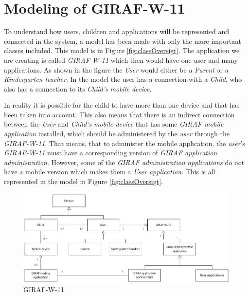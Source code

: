 \section{Modeling of GIRAF-W-11}
To understand how users, children and applications will be represented and connected in the system, a model  has been made with only the more important classes included. This model is in Figure \vref{fig:classOversigt}. The application we are creating is called \emph{GIRAF-W-11} which then would have one user and many applications. As shown in the figure the \emph{User} would either be a \emph{Parent} or a \emph{Kindergarten teacher}. In the model the user has a connection with a \emph{Child}, who also has a connection to its \emph{Child's mobile device}.

In reality it is possible for the child to have more than one device and that has been taken into account. This also means that there is an indirect connection between the \emph{User} and \emph{Child's mobile device} that has some \emph{GIRAF mobile application} installed, which should be administered by the \emph{user} through the \emph{GIRAF-W-11}. That means, that to administer the mobile application, the \emph{user}'s \emph{GIRAF-W-11} must have a corresponding version of \emph{GIRAF application administration}. However, some of the \emph{GIRAF administration applications} do not have a mobile version which makes them a \emph{User application}. This is all represented in the model in Figure \vref{fig:classOversigt}.


\begin{figure}[!ht]
	\centering
		\includegraphics[width=1.00\textwidth]{img/classOversigt.jpg}
	\caption{GIRAF-W-11}
	\label{fig:classOversigt}
\end{figure}
\newpage